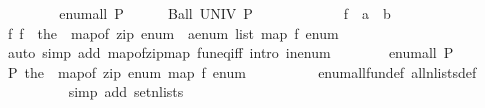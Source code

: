 \begin{isabellebody}
\ \ \isamarkupfalse%
\isanewline
\ \ \ \ \isamarkupfalse%
\ {\isachardoublequoteopen}enum{\isacharunderscore}{\kern0pt}all\ P{\isachardoublequoteclose}\isanewline
\ \ \ \ \isamarkupfalse%
\ {\isachardoublequoteopen}Ball\ UNIV\ P{\isachardoublequoteclose}\isanewline
\ \ \ \ \isamarkupfalse%
\isanewline
\ \ \ \ \ \ \isamarkupfalse%
\ f\ {\isacharcolon}{\kern0pt}{\isacharcolon}{\kern0pt}\ {\isachardoublequoteopen}{\isacharprime}{\kern0pt}a\ {\isasymRightarrow}\ {\isacharprime}{\kern0pt}b{\isachardoublequoteclose}\isanewline
\ \ \ \ \ \ \isamarkupfalse%
\ f{\isacharcolon}{\kern0pt}\ {\isachardoublequoteopen}f\ {\isacharequal}{\kern0pt}\ the\ {\isasymcirc}\ map{\isacharunderscore}{\kern0pt}of\ {\isacharparenleft}{\kern0pt}zip\ {\isacharparenleft}{\kern0pt}enum\ {\isacharcolon}{\kern0pt}{\isacharcolon}{\kern0pt}\ {\isacharprime}{\kern0pt}a{\isacharcolon}{\kern0pt}{\isacharcolon}{\kern0pt}enum\ list{\isacharparenright}{\kern0pt}\ {\isacharparenleft}{\kern0pt}map\ f\ enum{\isacharparenright}{\kern0pt}{\isacharparenright}{\kern0pt}{\isachardoublequoteclose}\isanewline
\ \ \ \ \ \ \ \ \isamarkupfalse%
\ {\isacharparenleft}{\kern0pt}auto\ simp\ add{\isacharcolon}{\kern0pt}\ map{\isacharunderscore}{\kern0pt}of{\isacharunderscore}{\kern0pt}zip{\isacharunderscore}{\kern0pt}map\ fun{\isacharunderscore}{\kern0pt}eq{\isacharunderscore}{\kern0pt}iff\ intro{\isacharcolon}{\kern0pt}\ in{\isacharunderscore}{\kern0pt}enum{\isacharparenright}{\kern0pt}\isanewline
\ \ \ \ \ \ \isamarkupfalse%
\ {\isacartoucheopen}enum{\isacharunderscore}{\kern0pt}all\ P{\isacartoucheclose}\ \isamarkupfalse%
\ {\isachardoublequoteopen}P\ {\isacharparenleft}{\kern0pt}the\ {\isasymcirc}\ map{\isacharunderscore}{\kern0pt}of\ {\isacharparenleft}{\kern0pt}zip\ enum\ {\isacharparenleft}{\kern0pt}map\ f\ enum{\isacharparenright}{\kern0pt}{\isacharparenright}{\kern0pt}{\isacharparenright}{\kern0pt}{\isachardoublequoteclose}\isanewline
\ \ \ \ \ \ \ \ \isamarkupfalse%
\ enum{\isacharunderscore}{\kern0pt}all{\isacharunderscore}{\kern0pt}fun{\isacharunderscore}{\kern0pt}def\ all{\isacharunderscore}{\kern0pt}n{\isacharunderscore}{\kern0pt}lists{\isacharunderscore}{\kern0pt}def\isanewline
\ \ \ \ \ \ \ \ \isamarkupfalse%
\ {\isacharparenleft}{\kern0pt}simp\ add{\isacharcolon}{\kern0pt}\ set{\isacharunderscore}{\kern0pt}n{\isacharunderscore}{\kern0pt}lists{\isacharparenright}{\kern0pt}\isanewline
\ \ \ \ \ \ \ \ \isamarkupfalse%

\end{isabellebody}
